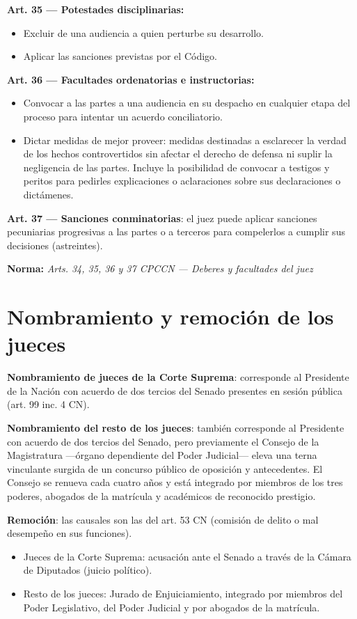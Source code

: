 \documentclass[12pt,oneside]{book}
\newcommand{\norma}[1]{%
\par\noindent\textbf{Norma:} \textit{#1}\par\smallskip
}
\begin{document}
\textbf{Art. 35 --- Potestades disciplinarias:}
\begin{itemize}
    \item Excluir de una audiencia a quien perturbe su desarrollo.
    \item Aplicar las sanciones previstas por el Código.
\end{itemize}

\textbf{Art. 36 --- Facultades ordenatorias e instructorias:}
\begin{itemize}
    \item Convocar a las partes a una audiencia en su despacho en cualquier etapa del proceso para intentar un acuerdo conciliatorio.
    \item Dictar medidas de mejor proveer: medidas destinadas a esclarecer la verdad de los hechos controvertidos sin afectar el derecho de defensa ni suplir la negligencia de las partes. Incluye la posibilidad de convocar a testigos y peritos para pedirles explicaciones o aclaraciones sobre sus declaraciones o dictámenes.
\end{itemize}

\textbf{Art. 37 --- Sanciones conminatorias}: el juez puede aplicar sanciones pecuniarias progresivas a las partes o a terceros para compelerlos a cumplir sus decisiones (astreintes).

\norma{Arts. 34, 35, 36 y 37 CPCCN --- Deberes y facultades del juez}

\section{Nombramiento y remoción de los jueces}

\textbf{Nombramiento de jueces de la Corte Suprema}: corresponde al Presidente de la Nación con acuerdo de dos tercios del Senado presentes en sesión pública (art. 99 inc. 4 CN).

\textbf{Nombramiento del resto de los jueces}: también corresponde al Presidente con acuerdo de dos tercios del Senado, pero previamente el Consejo de la Magistratura —órgano dependiente del Poder Judicial— eleva una terna vinculante surgida de un concurso público de oposición y antecedentes. El Consejo se renueva cada cuatro años y está integrado por miembros de los tres poderes, abogados de la matrícula y académicos de reconocido prestigio.

\textbf{Remoción}: las causales son las del art. 53 CN (comisión de delito o mal desempeño en sus funciones).

\begin{itemize}
    \item Jueces de la Corte Suprema: acusación ante el Senado a través de la Cámara de Diputados (juicio político).
    \item Resto de los jueces: Jurado de Enjuiciamiento, integrado por miembros del Poder Legislativo, del Poder Judicial y por abogados de la matrícula.
\end{itemize}
\end{document}

